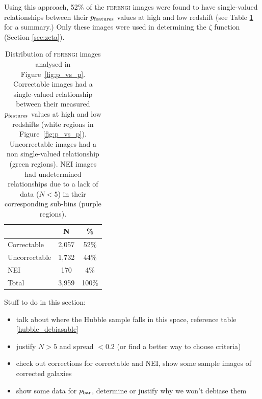 \documentclass[usenatbib]{mn2e}
\newcommand{\ferengi}{\textsc{ferengi}}
\newcommand{\pbar}{p_{\rm bar}}
\begin{document}
Using this approach, 52\% of the \ferengi{} images were found to have single-valued relationships between their $p_{\rm features}$ values at high and low redshift (see Table \ref{ferengi_corrections} for a summary.) Only these images were used in determining the $\zeta$ function (Section \ref{sec:zeta}).  


\begin{table}
\caption{Distribution of \ferengi{} images analysed in Figure~\ref{fig:p_vs_p}. Correctable images had a single-valued relationship between their measured $p_{\rm features}$ values at high and low redshifts (white regions in Figure~\ref{fig:p_vs_p}). Uncorrectable images had a non single-valued relationship (green regions). NEI images had undetermined relationships due to a lack of data ($N<5$) in their corresponding sub-bins (purple regions).   \label{ferengi_corrections}}
\begin{tabular}{lcc}
\hline \hline
				   & N     & \% \\
\hline 
Correctable                        & 2,057   & 52\% \\
Uncorrectable                      & 1,732   & 44\% \\
NEI                                & 170     &  4\%\\
Total                              & 3,959   & 100\% \\
\hline \hline
\end{tabular}
\end{table}


Stuff to do in this section: 

\begin{itemize}
\item talk about where the Hubble sample falls in this space, reference table \ref{hubble_debiasable} 
\item justify $N>5$ and spread $< 0.2$ (or find a better way to choose criteria)
\item check out corrections for correctable and NEI, show some sample images of corrected galaxies
\item show some data for $\pbar$, determine or justify why we won't debiase them  
\end{itemize}
\end{document}
